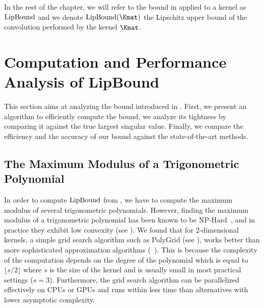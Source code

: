 In the rest of the chapter, we will refer to the bound in  applied to a kernel as $\mathrm{LipBound}$ and we denote $\lipbound(\Kmat)$ the Lipschitz upper bound of the convolution performed by the kernel $\Kmat$. 


\section{Computation and Performance Analysis of LipBound}
\label{section:ch5-computation_and_performance_analysis_of_lipbound}

This section aims at analyzing the bound introduced in .
First, we present an algorithm to efficiently compute the bound, we analyze its tightness by comparing it against the true largest singular value.
Finally, we compare the efficiency and the accuracy of our bound against the state-of-the-art methods.

\subsection{The Maximum Modulus of a Trigonometric Polynomial}
\label{subsection:ch5-computing_the_maximum_modulus_of_a_trigonometric_polynomial}

In order to compute $\mathrm{LipBound}$ from , we have to compute the maximum modulus of several trigonometric polynomials.
However, finding the maximum modulus of a trigonometric polynomial has been known to be NP-Hard~\cite{pfister2018bounding}, and in practice they exhibit low convexity (see ).
We found that for 2-dimensional kernels, a simple grid search algorithm such as PolyGrid (see ), works better than more sophisticated approximation algorithms (\eg ~\citet{green1999calculating,de2009finding}).
This is because the complexity of the computation depends on the degree of the polynomial which is equal to $\lfloor s / 2 \rfloor$ where $s$ is the size of the kernel and is usually small in most practical settings (\eg $s=3$).
Furthermore, the grid search algorithm can be parallelized effectively on CPUs or GPUs and runs within less time than alternatives with lower asymptotic complexity. 

